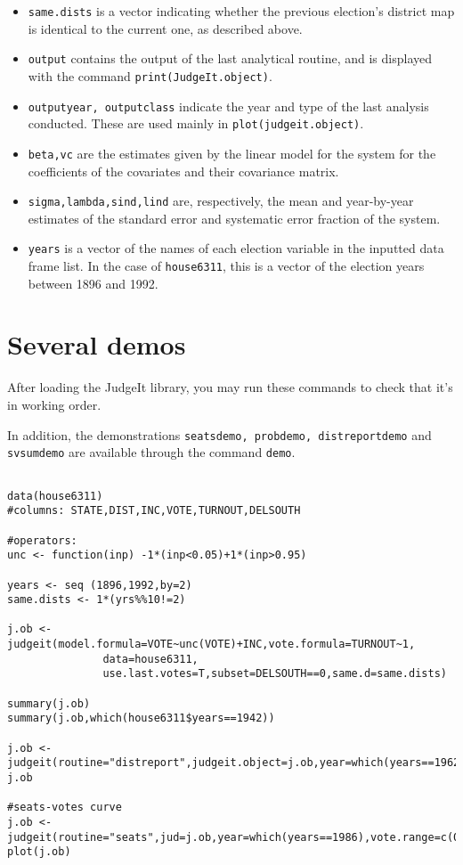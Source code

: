 \documentclass[oneside,letterpaper,titlepage]{article}
\begin{document}
\begin{itemize}
\item \texttt{same.dists} is a vector indicating whether the previous
  election's district map is identical to the current one, as
  described above.

\item \texttt{output} contains the output of the last analytical
  routine, and is displayed with the command
  \texttt{print(JudgeIt.object)}.

\item \texttt{outputyear, outputclass} indicate the year and type of
  the last analysis conducted. These are used mainly in
  \texttt{plot(judgeit.object)}.

\item \texttt{beta,vc} are the estimates given by the linear model for
  the system for the coefficients of the covariates and their
  covariance matrix.

\item \texttt{sigma,lambda,sind,lind} are, respectively, the mean and
  year-by-year estimates of the standard error and systematic error
  fraction of the system.

\item \texttt{years} is a vector of the names of each election
  variable in the inputted data frame list. In the case of
  \texttt{house6311}, this is a vector of the election years between
  1896 and 1992.

\end{itemize}

\appendix

\section{Several demos}

After loading the JudgeIt library, you may run these commands to check
that it's in working order.

In addition, the demonstrations \texttt{seatsdemo, probdemo,
  distreportdemo} and \texttt{svsumdemo} are available through the
command \texttt{demo}.

\begin{verbatim}

data(house6311)
#columns: STATE,DIST,INC,VOTE,TURNOUT,DELSOUTH

#operators:
unc <- function(inp) -1*(inp<0.05)+1*(inp>0.95)

years <- seq (1896,1992,by=2)
same.dists <- 1*(yrs%%10!=2)

j.ob <- judgeit(model.formula=VOTE~unc(VOTE)+INC,vote.formula=TURNOUT~1,
               data=house6311,
               use.last.votes=T,subset=DELSOUTH==0,same.d=same.dists)

summary(j.ob)
summary(j.ob,which(house6311$years==1942))

j.ob <- judgeit(routine="distreport",judgeit.object=j.ob,year=which(years==1962),new.covariates=list("INC",0),vote.range=c(0.1,0.9))
j.ob

#seats-votes curve
j.ob <- judgeit(routine="seats",jud=j.ob,year=which(years==1986),vote.range=c(0.2,0.8))
plot(j.ob)

\end{verbatim}
\end{document}
